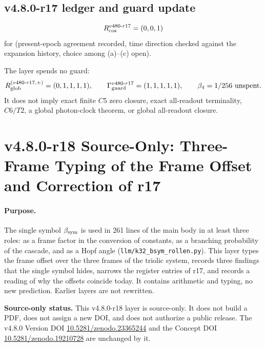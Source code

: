 \subsection*{v4.8.0-r17 ledger and guard update}
\label{subsec:v480-r17-ledger-guard}

\[
R_{\rm cos}^{v480\text{-}r17}=(0,0,1)
\]
for (present-epoch agreement recorded, time direction checked against the expansion history, choice among
(a)--(c) open).

The layer spends no guard:
\[
R_{\rm glob}^{(v480\text{-}r17,+)}=(0,1,1,1,1),
\qquad
\Gamma_{\rm guard}^{v480\text{-}r17}=(1,1,1,1,1),
\qquad
\beta_4=1/256\ \text{unspent}.
\]
It does not imply exact finite \(C5\) zero closure, exact all-readout terminality,
\(C6/T2\), a global photon-clock theorem, or global all-readout closure.

\clearpage
\section*{v4.8.0-r18 Source-Only: Three-Frame Typing of the Frame Offset and Correction of r17}
\label{sec:v480-r18-three-frame-typing}

\paragraph{Purpose.}
The single symbol \(\beta_{\mathrm{sym}}\) is used in 261 lines of the main body in at least three roles: as a frame factor in
the conversion of constants, as a branching probability of the cascade, and as a Hopf angle
(\texttt{llm/k32\_bsym\_rollen.py}).  This layer types the frame offset over the three frames of the triolic
system, records three findings that the single symbol hides, narrows the register entries of r17, and records a
reading of why the offsets coincide today.  It contains arithmetic and typing, no new prediction.  Earlier layers
are not rewritten.

\noindent\textbf{Source-only status.}
This v4.8.0-r18 layer is source-only.  It does not build a PDF, does not assign a new DOI,
and does not authorize a public release.  The v4.8.0 Version DOI
\href{https://doi.org/10.5281/zenodo.23365244}{10.5281/zenodo.23365244} and the Concept DOI
\href{https://doi.org/10.5281/zenodo.19210728}{10.5281/zenodo.19210728} are unchanged by it.


